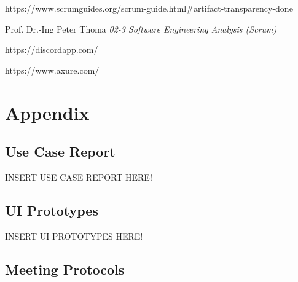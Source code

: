 \documentclass[a4paper, 12pt]{article}
\begin{document}
\newpage    
\begin{thebibliography}{}
https://www.scrumguides.org/scrum-guide.html\#artifact-transparency-done 

 Prof. Dr.-Ing Peter Thoma \emph{02-3 Software Engineering Analysis (Scrum)}
 
 https://discordapp.com/
 
 https://www.axure.com/

\end{thebibliography}


\newpage

\section{Appendix}

\subsection{Use Case Report}
INSERT USE CASE REPORT HERE!

\subsection{UI Prototypes}
INSERT UI PROTOTYPES HERE!

\subsection{Meeting Protocols}
\end{document}
